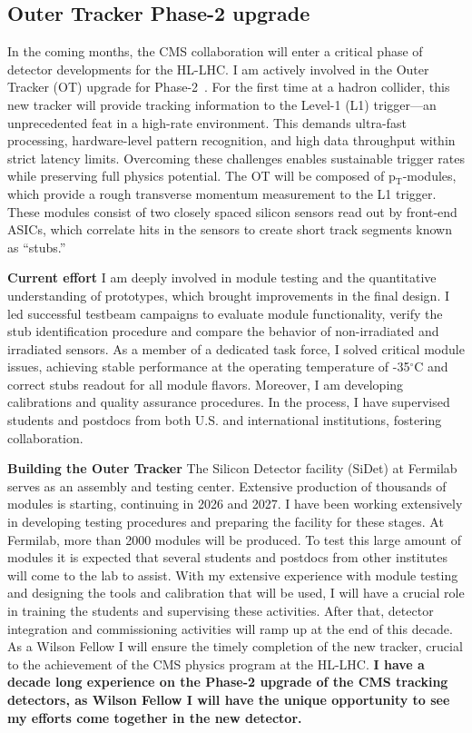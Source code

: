 {\begin{flushleft}
\subsection{Outer Tracker Phase-2 upgrade}
\vskip 4pt 
In the coming months, the CMS collaboration will enter a critical phase of detector developments for the HL-LHC. I am actively involved in the Outer Tracker (OT) upgrade for Phase-2~\cite{[7]}. For the first time at a hadron collider, this new tracker will provide tracking information to the Level-1 (L1) trigger—an unprecedented feat in a high-rate environment. This demands ultra-fast processing, hardware-level pattern recognition, and high data throughput within strict latency limits. Overcoming these challenges enables sustainable trigger rates while preserving full physics potential. %
The OT will be composed of p$_{\mathrm{T}}$-modules, which provide a rough transverse momentum measurement to the L1 trigger. These modules consist of two closely spaced silicon sensors read out by front-end ASICs, which correlate hits in the sensors to create short track segments known as ``stubs.'' %

\textbf{Current effort}
I am deeply involved in module testing and the quantitative understanding of prototypes, which brought improvements in the final design. I led successful testbeam campaigns to evaluate module functionality, verify the stub identification procedure and compare the behavior of non-irradiated and irradiated sensors. As a member of a dedicated task force, I solved critical module issues, achieving stable performance at the operating temperature of -35$^{\circ}$C and correct stubs readout for all module flavors. Moreover, I am developing calibrations and quality assurance procedures. In the process, I have supervised students and postdocs from both U.S. and international institutions, fostering collaboration.

\textbf{Building the Outer Tracker}
The Silicon Detector facility (SiDet) at Fermilab serves as an assembly and testing center. Extensive production of thousands of modules is starting, continuing in 2026 and 2027. I have been working extensively in developing testing procedures and preparing the facility for these stages. At Fermilab, more than 2000 modules will be produced. To test this large amount of modules it is expected that several students and postdocs from other institutes will come to the lab to assist. With my extensive experience with module testing and designing the tools and calibration that will be used, I will have a crucial role in training the students and supervising these activities. 
After that, detector integration and commissioning activities will ramp up at the end of this decade. As a Wilson Fellow I will ensure the timely completion of the new tracker, crucial to the  achievement of the CMS physics program at the HL-LHC.
\textbf{I have a decade long experience on the Phase-2 upgrade of the CMS tracking detectors, as Wilson Fellow I will have the unique opportunity to see my efforts come together in the new detector.} 


\end{flushleft}}
